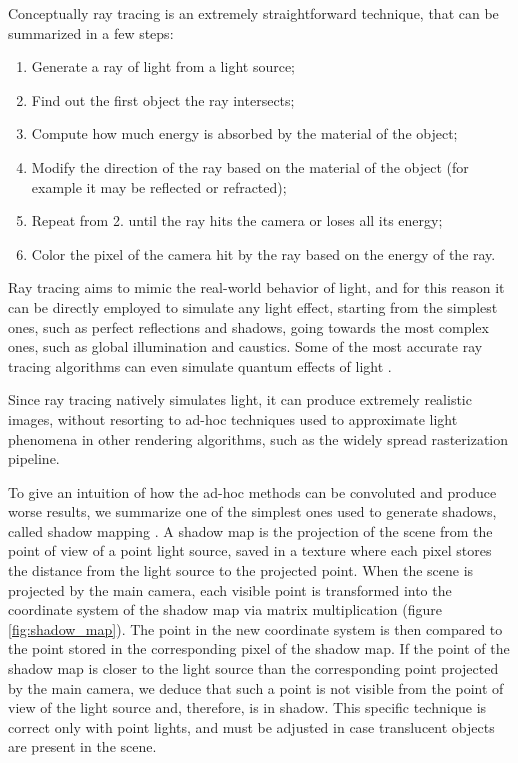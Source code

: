 \documentclass{PoliMi_MasterThesis}
\begin{document}
Conceptually ray tracing is an extremely straightforward technique, that can be summarized in a few steps:
\begin{enumerate}
\item Generate a ray of light from a light source;
\item Find out the first object the ray intersects;
\item Compute how much energy is absorbed by the material of the object;
\item Modify the direction of the ray based on the material of the object (for example it may be reflected or refracted);
\item Repeat from 2. until the ray hits the camera or loses all its energy;
\item Color the pixel of the camera hit by the ray based on the energy of the ray.
\end{enumerate}

Ray tracing aims to mimic the real-world behavior of light, and for this reason it can be directly employed to simulate any light effect, starting from the simplest ones, such as perfect reflections and shadows, going towards the most complex ones, such as global illumination and caustics. Some of the most accurate ray tracing algorithms can even simulate quantum effects of light \cite{quantum_ray_tracing}.

Since ray tracing natively simulates light, it can produce extremely realistic images, without resorting to ad-hoc techniques used to approximate light phenomena in other rendering algorithms, such as the widely spread rasterization pipeline.

To give an intuition of how the ad-hoc methods can be convoluted and produce worse results, we summarize one of the simplest ones used to generate shadows, called shadow mapping \cite{shadow_maps}. A shadow map is the projection of the scene from the point of view of a point light source, saved in a texture where each pixel stores the distance from the light source to the projected point. When the scene is projected by the main camera, each visible point is transformed into the coordinate system of the shadow map via matrix multiplication (figure \ref{fig:shadow_map}). The point in the new coordinate system is then compared to the point stored in the corresponding pixel of the shadow map. If the point of the shadow map is closer to the light source than the corresponding point projected by the main camera, we deduce that such a point is not visible from the point of view of the light source and, therefore, is in shadow. This specific technique is correct only with point lights, and must be adjusted in case translucent objects are present in the scene.
\end{document}
